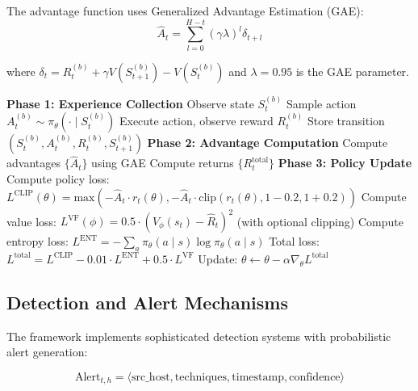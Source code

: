 \documentclass[12pt,oneside]{article}
\begin{document}
The advantage function uses Generalized Advantage Estimation (GAE):
\begin{equation}
\hat{A}_t = \sum_{l=0}^{H-t} (\gamma \lambda)^l \delta_{t+l}
\end{equation}

where $\delta_t = R_t^{(b)} + \gamma V(S_{t+1}^{(b)}) - V(S_t^{(b)})$ and $\lambda = 0.95$ is the GAE parameter.

\begin{algorithm}
\caption{PPO Training for Blue Agent}
\begin{algorithmic}[1]
\STATE \textbf{Phase 1: Experience Collection}
        \STATE Observe state $S_t^{(b)}$
        \STATE Sample action $A_t^{(b)} \sim \pi_\theta(\cdot \mid S_t^{(b)})$
        \STATE Execute action, observe reward $R_t^{(b)}$
        \STATE Store transition $(S_t^{(b)}, A_t^{(b)}, R_t^{(b)}, S_{t+1}^{(b)})$
    \ENDFOR
\ENDFOR
\STATE \textbf{Phase 2: Advantage Computation}
\STATE Compute advantages $\{\hat{A}_t\}$ using GAE
\STATE Compute returns $\{R_t^{\text{total}}\}$
\STATE \textbf{Phase 3: Policy Update}
        \STATE Compute policy loss: $L^{\text{CLIP}}(\theta) = \text{max}(-\hat{A}_t \cdot r_t(\theta), -\hat{A}_t \cdot \text{clip}(r_t(\theta), 1-0.2, 1+0.2))$
        \STATE Compute value loss: $L^{\text{VF}}(\phi) = 0.5 \cdot (V_\phi(s_t) - \hat{R}_t)^2$ (with optional clipping)
        \STATE Compute entropy loss: $L^{\text{ENT}} = -\sum_a \pi_\theta(a \mid s) \log \pi_\theta(a \mid s)$
        \STATE Total loss: $L^{\text{total}} = L^{\text{CLIP}} - 0.01 \cdot L^{\text{ENT}} + 0.5 \cdot L^{\text{VF}}$
        \STATE Update: $\theta \leftarrow \theta - \alpha \nabla_\theta L^{\text{total}}$
    \ENDFOR
\ENDFOR
\end{algorithmic}
\end{algorithm}

\subsection{Detection and Alert Mechanisms}

The framework implements sophisticated detection systems with probabilistic alert generation:

\begin{equation}
\text{Alert}_{t,h} = \langle \text{src\_host}, \text{techniques}, \text{timestamp}, \text{confidence} \rangle
\end{equation}
\end{document}
